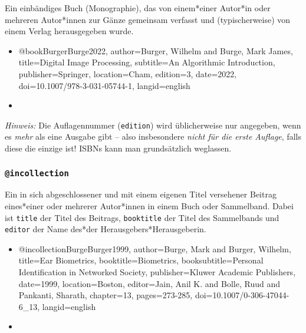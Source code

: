 Ein einbändiges Buch (Monographie), das von einem*einer Autor*in oder
mehreren Autor*innen zur Gänze gemeinsam verfasst und (typischerweise) von
einem Verlag herausgegeben wurde.
% 
\begin{itemize}
\item[]
\begin{GenericCode}[numbers=none]
@book{BurgerBurge2022,
	author={Burger, Wilhelm and Burge, Mark James},
	title={Digital Image Processing},
	subtitle={An Algorithmic Introduction},
	publisher={Springer},
	location={Cham},
	edition={3},
	date={2022},
	doi={10.1007/978-3-031-05744-1},
	langid={english}
}
\end{GenericCode}
\item[\cite{BurgerBurge2022}] 
\end{itemize}
%
\emph{Hinweis:} Die Auflagennummer (\texttt{edition}) wird üblicherweise nur
angegeben, wenn es \emph{mehr} als eine Ausgabe gibt -- also insbesondere
\emph{nicht für die erste Auflage}, falls diese die einzige ist! ISBNs
kann man grundsätzlich weglassen.


\subsubsection{\texttt{\bfseries @incollection}}
\label{sec:@incollection}

Ein in sich abgeschlossener und mit einem eigenen Titel versehener Beitrag
eines*einer oder mehrerer Autor*innen in einem Buch oder Sammelband. Dabei
ist \texttt{title} der Titel des Beitrags, \texttt{booktitle} der Titel des
Sammelbands und \texttt{editor} der Name des*der Herausgebers*Herausgeberin.
%
\begin{itemize}
\item[]
\begin{GenericCode}[numbers=none]
@incollection{BurgeBurger1999,
  author={Burge, Mark and Burger, Wilhelm},
  title={Ear Biometrics},
  booktitle={Biometrics},
  booksubtitle={Personal Identification in Networked Society},
  publisher={Kluwer Academic Publishers},
  date={1999},
  location={Boston},
  editor={Jain, Anil K. and Bolle, Ruud and Pankanti, Sharath},
  chapter={13},
  pages={273-285},
  doi={10.1007/0-306-47044-6_13},
  langid={english}
}
\end{GenericCode}
\item[\cite{BurgeBurger1999}] 
\end{itemize}


